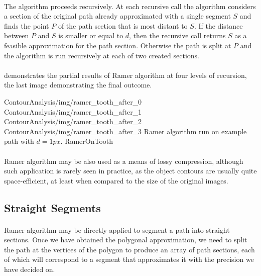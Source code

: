 \paragraph*{}
The algorithm proceeds recursively. At each recursive call the algorithm considers a section of the original path already approximated with a single segment $S$ and finds the point $P$ of the path section that is most distant to $S$. If the distance between $P$ and $S$ is smaller or equal to $d$, then the recursive call returns $S$ as a feasible approximation for the path section. Otherwise the path is split at $P$ and the algorithm is run recursively at each of two created sections.

\paragraph*{}
 demonstrates the partial results of Ramer algorithm at four levels of recursion, the last image demonstrating the final outcome.

\fourFigures
{ContourAnalysis/img/ramer_tooth_after_0}
{ContourAnalysis/img/ramer_tooth_after_1}
{ContourAnalysis/img/ramer_tooth_after_2}
{ContourAnalysis/img/ramer_tooth_after_3}
{Ramer algorithm run on example path with $d = 1px$.}
{RamerOnTooth}
{\basicWidth}

\paragraph*{}
Ramer algorithm may be also used as a means of lossy compression, although such application is rarely seen in practice, as the object contours are usually quite space-efficient, at least when compared to the size of the original images.

\subsection{Straight Segments}

\paragraph*{}
Ramer algorithm may be directly applied to segment a path into straight sections. Once we have obtained the polygonal approximation, we need to split the path at the vertices of the polygon to produce an array of path sections, each of which will correspond to a segment that approximates it with the precision we have decided on.

